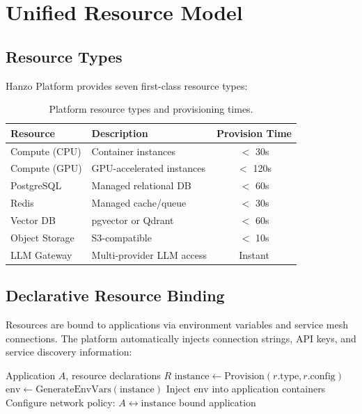 \section{Unified Resource Model}

\label{sec:resources}

\subsection{Resource Types}

Hanzo Platform provides seven first-class resource types:

\begin{table}[H]
\centering
\small
\begin{tabular}{llc}
\toprule
\textbf{Resource} & \textbf{Description} & \textbf{Provision Time} \\
\midrule
Compute (CPU) & Container instances & $<$ 30s \\
Compute (GPU) & GPU-accelerated instances & $<$ 120s \\
PostgreSQL & Managed relational DB & $<$ 60s \\
Redis & Managed cache/queue & $<$ 30s \\
Vector DB & pgvector or Qdrant & $<$ 60s \\
Object Storage & S3-compatible & $<$ 10s \\
LLM Gateway & Multi-provider LLM access & Instant \\
\bottomrule
\end{tabular}
\caption{Platform resource types and provisioning times.}
\label{tab:resources}
\end{table}

\subsection{Declarative Resource Binding}

Resources are bound to applications via environment variables and service mesh connections. The platform automatically injects connection strings, API keys, and service discovery information:

\begin{algorithm}[H]
\caption{Resource Binding}
\label{alg:binding}
\begin{algorithmic}[1]
\Require Application $A$, resource declarations $R$
    \State $\text{instance} \gets \text{Provision}(r.\text{type}, r.\text{config})$
    \State $\text{env} \gets \text{GenerateEnvVars}(\text{instance})$
    \State Inject $\text{env}$ into application containers
    \State Configure network policy: $A \leftrightarrow \text{instance}$
\EndFor
\State \Return bound application
\end{algorithmic}
\end{algorithm}

